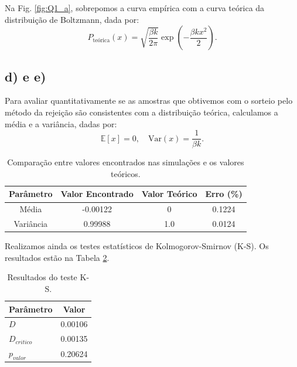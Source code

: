 \documentclass[a4paper, 12pt]{article}
\begin{document}
Na Fig. \ref{fig:Q1_a}, sobrepomos a curva empírica com a curva teórica da distribuição de Boltzmann, dada por:
\begin{equation}
P_{\text{teórica}}(x) = \sqrt{\frac{\beta k}{2 \pi}} \exp \left( -\frac{\beta k x^2}{2} \right).
\end{equation}

\subsection*{d) e e)}

Para avaliar quantitativamente se as amostras que obtivemos com o sorteio pelo método da rejeição são consistentes com a distribuição teórica, calculamos a média e a variância, dadas por: 
\begin{equation}
\mathbb{E}[x] = 0, \quad \text{Var}(x) = \frac{1}{\beta k}.
\end{equation}

\begin{table}[H]
\centering
\begin{tabular}{|c|c|c|c|}
\hline
\textbf{Parâmetro} & \textbf{Valor Encontrado} & \textbf{Valor Teórico} & \textbf{Erro (\%)} \\ \hline
Média              & -0.00122                  & 0                      & 0.1224             \\ \hline
Variância          & 0.99988                   & 1.0                    & 0.0124             \\ \hline
\end{tabular}
\caption{Comparação entre valores encontrados nas simulações e os valores teóricos.}
\label{tab:media_variancia}
\end{table}

Realizamos ainda os testes estatísticos de Kolmogorov-Smirnov (K-S). Os resultados estão na Tabela \ref{tab:teste_ks}.

\begin{table}[H]
\centering
\begin{tabular}{|l|c|}
\hline
\textbf{Parâmetro} & \textbf{Valor} \\ \hline
$D$                & 0.00106        \\ \hline
$D_{critico}$      & 0.00135        \\ \hline
$p_{valor}$        & 0.20624        \\ \hline
\end{tabular}
\caption{Resultados do teste K-S.}
\label{tab:teste_ks}
\end{table}
\end{document}
